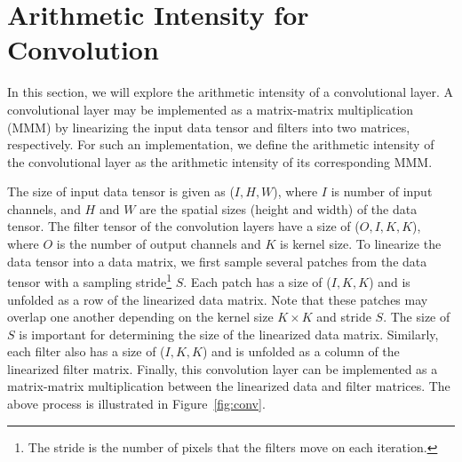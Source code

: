 \documentclass[a4 paper]{article}
\begin{document}

\section{Arithmetic Intensity for Convolution}
\label{sec:cnn_ai}
In this section, we will explore the arithmetic intensity of a convolutional layer.
A convolutional layer may be implemented as a matrix-matrix multiplication (MMM) by linearizing the input data tensor and filters into two matrices, respectively. 
For such an implementation, we define the arithmetic intensity of the convolutional layer as the arithmetic intensity of its corresponding MMM.

The size of input data tensor is given as ($I, H, W$), where $I$ is number of input channels, and $H$ and $W$ are the spatial sizes (height and width) of the data tensor. 
The filter tensor of the convolution layers have a size of ($O, I, K, K$), where $O$ is the number of output channels and $K$ is kernel size.
To linearize the data tensor into a data matrix, we first sample several patches from the data tensor with a sampling stride\footnote{The stride is the number of pixels that the filters move on each iteration.} $S$.
Each patch has a size of ($I, K, K$) and is unfolded as a row of the linearized data matrix. 
Note that these patches may overlap one another depending on the kernel size $K \times K$ and stride $S$. 
The size of $S$ is important for determining the size of the linearized data matrix.
Similarly, each filter also has a size of ($I, K, K$) and is unfolded as a column of the linearized filter matrix.
Finally, this convolution layer can be implemented as a matrix-matrix multiplication between the linearized data and filter matrices.
The above process is illustrated in Figure~\ref{fig:conv}.
\end{document}
